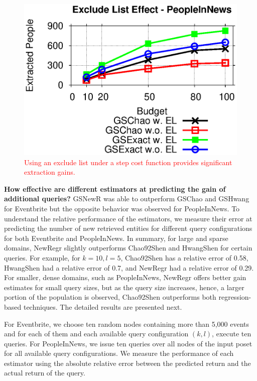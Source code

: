 \begin{figure}[t]
	\begin{center}
	\includegraphics[clip,scale=0.45]{figs/exEffect.eps}
	\caption{\textcolor{red}{Using an exclude list under a step cost function provides significant extraction gains.}}
	\label{fig:exEffect}
	\end{center}
	\vspace{-10pt}
\end{figure}

\noindent\textbf{How effective are different estimators at predicting the gain of additional queries?}
GSNewR was able to outperform GSChao and GSHwang for Eventbrite but the opposite behavior was observed for PeopleInNews. To understand the relative performance of the estimators, we measure their error at predicting the number of new retrieved entities for different query configurations for both Eventbrite and PeopleInNews.
In summary, for large and sparse domains, NewRegr slightly outperforms Chao92Shen and HwangShen for certain queries. For example, for $k = 10, l = 5$, Chao92Shen has a relative error of 0.58, HwangShen had a relative error of 0.7, and NewRegr had a relative error of 0.29. For smaller, dense domains, such as PeopleInNews, NewRegr offers better gain estimates for small query sizes, but as the query size increases, hence, a larger portion of the population is observed, Chao92Shen outperforms both regression-based techniques. The detailed results are presented next.

For Eventbrite, we choose ten random nodes containing more than 5,000 events and for each of them and each available query configuration $(k,l)$, execute ten queries. For PeopleInNews, we issue ten queries over all nodes of the input poset for all available query configurations.  We measure the performance of each estimator using the absolute relative error between the predicted return and the actual return of the query.

